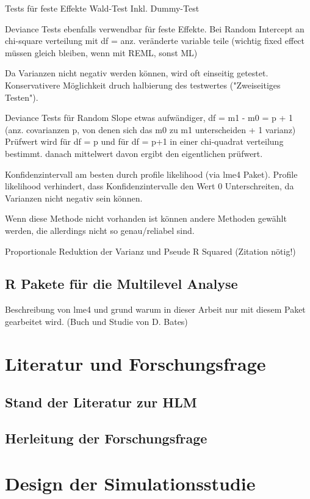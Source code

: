 \documentclass[12pt]{article}\usepackage[]{graphicx}\usepackage[]{color}
\begin{document}
Tests für feste Effekte Wald-Test \cite{SnijdersTomA.B2012Ma:a} Inkl. Dummy-Test

Deviance Tests ebenfalls verwendbar für feste Effekte. Bei Random Intercept an chi-square verteilung mit df = anz. veränderte variable teile (wichtig fixed effect müssen gleich bleiben, wenn mit REML, sonst ML)

Da Varianzen nicht negativ werden können, wird oft einseitig getestet. Konservativere Möglichkeit druch halbierung des testwertes ("Zweiseitiges Testen").


Deviance Tests für Random Slope etwas aufwändiger, df = m1 - m0 = p + 1 (anz. covarianzen p, von denen sich das m0 zu m1 unterscheiden + 1 varianz) Prüfwert wird für df = p und für df = p+1 in einer chi-quadrat verteilung bestimmt. danach mittelwert davon ergibt den eigentlichen prüfwert. 

Konfidenzintervall am besten durch profile likelihood (via lme4 Paket). Profile likelihood verhindert, dass Konfidenzintervalle den Wert 0 Unterschreiten, da Varianzen nicht negativ sein können. 

Wenn diese Methode nicht vorhanden ist können andere Methoden gewählt werden, die allerdings nicht so genau/reliabel sind.

Proportionale Reduktion der Varianz und Pseude R Squared (Zitation nötig!)

\subsection{R Pakete für die Multilevel Analyse}
Beschreibung von lme4 und grund warum in dieser Arbeit nur mit diesem Paket gearbeitet wird. (Buch und Studie von D. Bates)

\section{Literatur und Forschungsfrage}
\subsection{Stand der Literatur zur HLM}
\subsection{Herleitung der Forschungsfrage}

\section{Design der Simulationsstudie}
\end{document}
